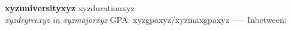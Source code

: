\item \textbf{xyzuniversityxyz} \hfill xyzdurationxyz \\
\textit{xyzdegreexyz in xyzmajorxyz} \hfill GPA\@: xyzgpaxyz/xyzmaxgpaxyz
-----
Inbetween: \vspace{3pt}
